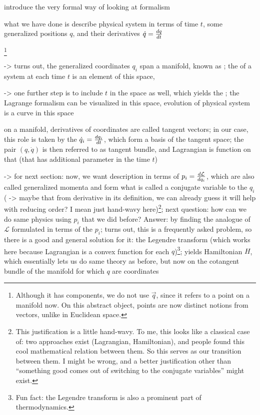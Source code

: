 \documentclass[../class_mech_main.tex]{subfiles}
\begin{document}

introduce the very formal way of looking at formalism

what we have done is describe physical system in terms of time $t$, some generalized positions $q$, and their derivatives $\dot{q} = \dv{q}{t}$

\footnote{Although it has components, we do not use $\vec{q}$, since it refers to a point on a manifold now. On this abstract object, points are now distinct notions from vectors, unlike in Euclidean space.}

-> turns out, the generalized coordinates $q_i$ span a manifold, known as ; the  of a system at each time $t$ is an element of this space, 

-> one further step is to include $t$ in the space as well, which yields the ; the Lagrange formalism can be visualized in this space, evolution of physical system is a curve in this space 



on a manifold, derivatives of coordinates are called tangent vectors; in our case, this role is taken by the $\dot{q}_i = \dv{q_i}{t}$, which form a basis of the tangent space; the pair $(q, \dot{q})$ is then referred to as tangent bundle, and Lagrangian is function on that (that has additional parameter in the time $t$)

-> for next section: now, we want description in terms of $p_i = \dv{\mathcal{L}}{q_i}$, which are also called generalized momenta and form what is called a conjugate variable to the $q_i$ ( -> maybe that from derivative in its definition, we can already guess it will help with reducing order? I mean just hand-wavy here)\footnote{This justification is a little hand-wavy. To me, this looks like a classical case of: two approaches exist (Lagrangian, Hamiltonian), and people found this cool mathematical relation between them. So this serves as our transition between them. I might be wrong, and a better justification other than \enquote{something good comes out of switching to the conjugate variables} might exist.}; next question: how can we do same physics using $p_i$ that we did before? Answer: by finding the analogue of $\mathcal{L}$ formulated in terms of the $p_i$; turns out, this is a frequently asked problem, so there is a good and general solution for it: the Legendre transform (which works here because Lagrangian is a convex function for each $q$)\footnote{Fun fact: the Legendre transform is also a prominent part of thermodynamics.}; yields Hamiltonian $H$, which essentially lets us do same theory as before, but now on the cotangent bundle of the manifold for which $q$ are coordinates 
\end{document}
